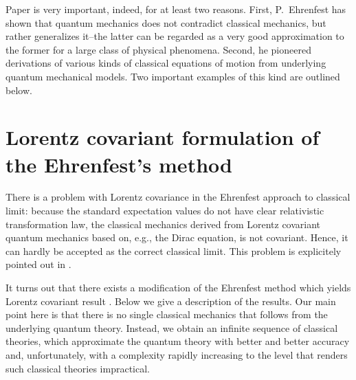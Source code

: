 \documentclass[12pt]{article}
\begin{document}
Paper \cite{ehr} is very important, indeed, for at least two reasons. First, P.~Ehrenfest has shown that quantum mechanics does not contradict classical mechanics, but rather generalizes it--the latter can be regarded as a very good approximation to the former for a large class of physical phenomena. 
Second, he pioneered derivations of various kinds of classical equations of motion from underlying quantum mechanical models. Two important examples of this kind are outlined below. 





\section{ Lorentz covariant formulation of the Ehrenfest's method }

There is a problem with Lorentz covariance in the Ehrenfest approach to classical limit: because the standard expectation values do not have clear relativistic transformation law, the classical mechanics derived from Lorentz covariant quantum mechanics based on, e.g., the Dirac equation, is not covariant. Hence, it can hardly be accepted as the correct classical limit. This problem is explicitely pointed out in \cite{HilWou}. 

It turns out that there exists a modification of the Ehrenfest method which yields Lorentz covariant result \cite{aro1}. Below we give a description of the results. Our main point here is that there is no single classical mechanics that follows from the underlying quantum theory. Instead, we obtain an infinite sequence of classical theories, which approximate the quantum theory with better and better accuracy and, unfortunately, with a complexity rapidly increasing to the level that renders such classical theories impractical. 
\end{document}
